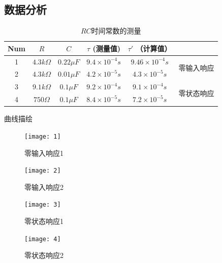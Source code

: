 \documentclass{../source/Experiment}
\begin{document}
        \subsection{数据分析}
        \begin{table}[htbp]
            \centering
            \caption{$RC$时间常数的测量}
            \begin{tabular}{c|c|c|c|c|c}
                    \hline
                    Num & $R$   & $C$    & $\tau$ (测量值)   & $\tau '$ （计算值） &                        \\ \hline
                    1 & $4.3k\Omega$ & $0.22\mu F$ & $9.4\times 10^{-4}s$ & $9.46\times 10^{-4}s$ & \multirow{2}{*}{零输入响应} \\ \cline{1-4}
                    2 & $4.3k\Omega$ & $0.01\mu F$ & $4.2\times 10^{-5}s$ & $4.3\times 10^{-5}s$ &                        \\ \hline
                    3 & $9.1k\Omega$ & $0.1\mu F$ & $9.2\times 10^{-4}s$ & $9.1\times 10^{-4}s$ & \multirow{2}{*}{零状态响应} \\ \cline{1-4}
                    4 & $750\Omega$ & $0.1\mu F$ & $8.4\times 10^{-5}s$ & $7.2\times 10^{-5}s$ &                        \\ \hline
            \end{tabular}
        \end{table}
        \par 
        曲线描绘\\
        \begin{figure}[htbp]          
                \begin{minipage}[t]{0.5\textwidth}
                    \centering
                    \texttt{[image: 1]}
                    \caption{零输入响应1\label{fig:1}}
                \end{minipage}
                \quad
                \begin{minipage}[t]{0.5\textwidth}
                    \centering
                    \texttt{[image: 2]}
                    \caption{零输入响应2\label{fig:2}}
                \end{minipage}
                \quad 
                \begin{minipage}[t]{0.5\textwidth}
                    \centering
                    \texttt{[image: 3]}
                    \caption{零状态响应1\label{fig:2}}
                \end{minipage}
                \quad 
                \begin{minipage}[t]{0.5\textwidth}
                    \centering
                    \texttt{[image: 4]}
                    \caption{零状态响应2\label{fig:2}}
                \end{minipage}
            \end{figure}
\end{document}
